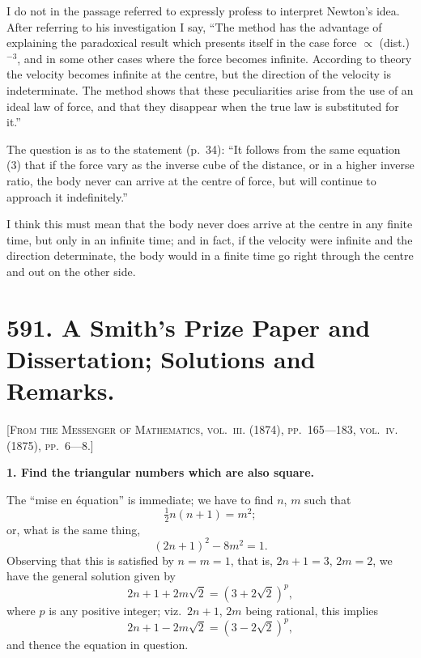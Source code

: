 \documentclass[11pt,a4paper]{book}
\begin{document}
\medskip

\noindent I do not in the passage referred to expressly profess to interpret Newton's idea. After referring to his investigation I say, ``The method has the advantage of explaining the paradoxical result which presents itself in the case force $\propto$ (dist.)$^{-3}$, and in some other cases where the force becomes infinite. According to theory the velocity becomes infinite at the centre, but the direction of the velocity is indeterminate. The method shows that these peculiarities arise from the use of an ideal law of force, and that they disappear when the true law is substituted for it.''

The question is as to the statement (p.~34): ``It follows from the same equation (3) that if the force vary as the inverse cube of the distance, or in a higher inverse ratio, the body never can arrive at the centre of force, but will continue to approach it indefinitely.''

I think this must mean that the body never does arrive at the centre in any finite time, but only in an infinite time; and in fact, if the velocity were infinite and the direction determinate, the body would in a finite time go right through the centre and out on the other side.

\newpage

\section*{591. A Smith's Prize Paper and Dissertation; Solutions and Remarks.}

\noindent\textsc{[From the Messenger of Mathematics, vol.~\textsc{iii}. (1874), pp.~165---183, vol.~\textsc{iv}. (1875), pp.~6---8.]}

\medskip

\noindent\textbf{1. Find the triangular numbers which are also square.}

The ``mise en \'{e}quation'' is immediate; we have to find $n$, $m$ such that
\[
\tfrac{1}{2}n(n+1) = m^2;
\]
or, what is the same thing,
\[
(2n+1)^2 - 8m^2 = 1.
\]
Observing that this is satisfied by $n = m = 1$, that is, $2n + 1 = 3$, $2m = 2$, we have the general solution given by
\[
2n + 1 + 2m\surd 2 = (3 + 2\surd 2)^p,
\]
where $p$ is any positive integer; viz.\ $2n+1$, $2m$ being rational, this implies
\[
2n + 1 - 2m\surd 2 = (3 - 2\surd 2)^p,
\]
and thence the equation in question.
\end{document}
